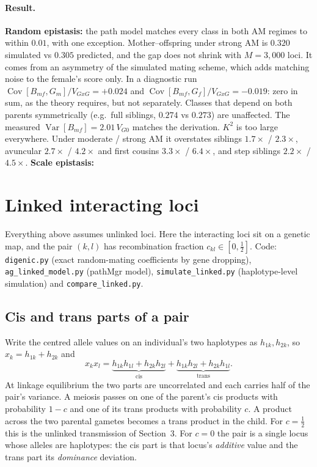 \documentclass[11pt]{article}
\newcommand{\Cov}{\operatorname{Cov}}
\newcommand{\Var}{\operatorname{Var}}
\newcommand{\VG}{V_{GxG}}
\begin{document}
\paragraph{Result.}
\textbf{Random epistasis:} the path model matches every class in both AM regimes to within $0.01$, with one
exception. Mother--offspring under strong AM is $0.320$ simulated vs $0.305$ predicted, and the gap does not
shrink with $M=3{,}000$ loci. It comes from an asymmetry of the simulated mating scheme, which adds matching
noise to the female's score only. In a diagnostic run $\Cov[B_{mf},G_m]/\VG=+0.024$ and
$\Cov[B_{mf},G_f]/\VG=-0.019$: zero in sum, as the theory requires, but not separately. Classes that
depend on both parents symmetrically (e.g.\ full siblings, $0.274$ vs $0.273$) are unaffected. The measured
$\Var[B_{mf}]=2.01\,V_{G0}$ matches the derivation.
$K^2$ is too large everywhere. Under moderate / strong AM it overstates siblings $1.7\times$ / $2.3\times$,
avuncular $2.7\times$ / $4.2\times$ and first cousins $3.3\times$ / $6.4\times$, and step siblings
$2.2\times$ / $4.5\times$.
\textbf{Scale epistasis:} 

\section{Linked interacting loci}\label{sec:linkage}
Everything above assumes unlinked loci. Here the interacting loci sit on a genetic map, and the pair
$(k,l)$ has recombination fraction $c_{kl}\in[0,\frac12]$. Code: \texttt{digenic.py} (exact random-mating
coefficients by gene dropping), \texttt{ag\_linked\_model.py} (pathMgr model), \texttt{simulate\_linked.py}
(haplotype-level simulation) and \texttt{compare\_linked.py}.

\subsection{Cis and trans parts of a pair}
Write the centred allele values on an individual's two haplotypes as $h_{1k},h_{2k}$, so $x_k=h_{1k}+h_{2k}$
and
\[
x_kx_l=\underbrace{h_{1k}h_{1l}+h_{2k}h_{2l}}_{\text{cis}}+\underbrace{h_{1k}h_{2l}+h_{2k}h_{1l}}_{\text{trans}} .
\]
At linkage equilibrium the two parts are uncorrelated and each carries half of the pair's variance. A
meiosis passes on one of the parent's cis products with probability $1-c$ and one of its trans products
with probability $c$. A product across the two parental gametes becomes a trans product in the child.
For $c=\frac12$ this is the unlinked transmission of Section~3. For $c=0$ the pair is a single locus whose alleles
are haplotypes: the cis part is that locus's \emph{additive} value and the trans part its \emph{dominance}
deviation.
\end{document}
